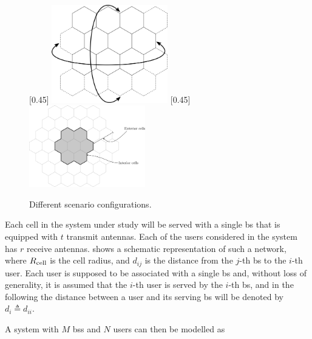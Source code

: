 \begin{figure}[t]
    [0.45\textwidth]
    {
     \includegraphics[width=0.45\textwidth]{./03.system_model/img/torus_scenario}
    }
    \hfill
    [0.45\textwidth]
    {
    \includegraphics[width=0.45\textwidth]{./03.system_model/img/interfering_scenario}
    }
    \caption{Different scenario configurations.}\label{fig:scenario_types}
\end{figure}

Each cell in the system under study will be served with a single \gls{bs} that
is equipped with $t$ transmit antennas. Each of the users considered in the
system has $r$ receive antennas.  shows a
schematic representation of such a network, where $R_{\text{cell}}$ is the cell
radius, and $d_{ij}$ is the distance from the $j$-th \gls{bs} to the $i$-th
user. Each user is supposed to be associated with a single \gls{bs} and, without
loss of generality, it is assumed that the $i$-th user is served by the $i$-th
\gls{bs}, and in the following the distance between a user and its serving
\gls{bs} will be denoted by $d_i \triangleq d_{ii}$.

A system with $M$ \glspl{bs} and $N$ users can then be modelled as

